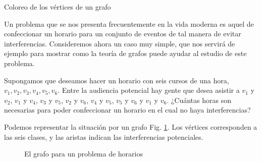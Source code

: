 \begin{section}{Coloreo de los vértices de un grafo} \label{seccion-coloreo-de-vertices}

Un problema que se nos presenta frecuentemente en la vida moderna es aquel de confeccionar un horario para un conjunto de eventos de tal manera de evitar interferencias. Consideremos ahora un caso muy simple, que nos servirá de ejemplo para mostrar como la teoría de grafos puede ayudar al estudio de este problema.

Supongamos que deseamos hacer un horario con seis cursos de una hora, $v_1,v_2,v_3,v_4,v_5,v_6$. Entre la audiencia potencial hay gente que desea asistir a $v_1$ y $v_2$, $v_1$ y $v_4$, $v_3$ y $v_5$, $v_2$ y $v_6$, $v_4$ y $v_5$, $v_5$ y $v_6$ y $v_1$ y $v_6$. ¿Cuántas horas son necesarias para poder confeccionar un horario en el cual no haya interferencias?

Podemos representar la situación por un grafo Fig. \ref{f5.10}. Los vértices corresponden a las seis clases, y las aristas indican las interferencias potenciales.

\begin{figure}[ht]
    \begin{center}
    \end{center}
\caption{El grafo para un problema de horarios} \label{f5.10}
\end{figure}


\end{section}
